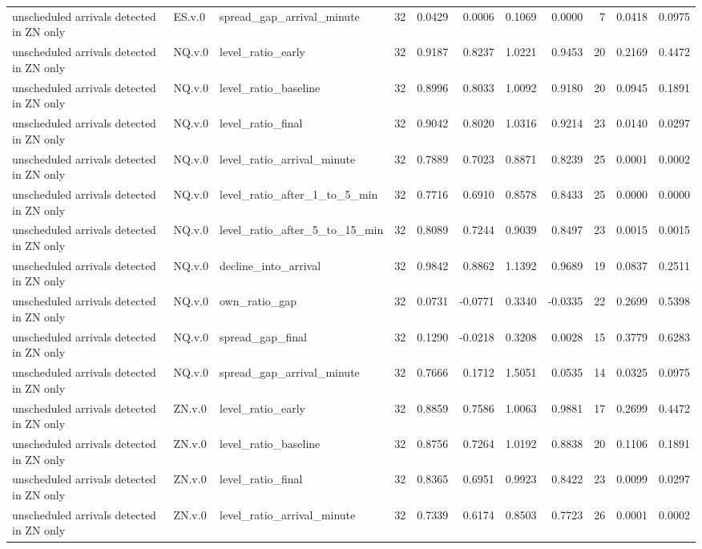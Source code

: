 \begin{tabular}{lllrrrrrrrr}
unscheduled arrivals detected in ZN only & ES.v.0 & spread_gap_arrival_minute & 32 & 0.0429 & 0.0006 & 0.1069 & 0.0000 & 7 & 0.0418 & 0.0975 \\
unscheduled arrivals detected in ZN only & NQ.v.0 & level_ratio_early & 32 & 0.9187 & 0.8237 & 1.0221 & 0.9453 & 20 & 0.2169 & 0.4472 \\
unscheduled arrivals detected in ZN only & NQ.v.0 & level_ratio_baseline & 32 & 0.8996 & 0.8033 & 1.0092 & 0.9180 & 20 & 0.0945 & 0.1891 \\
unscheduled arrivals detected in ZN only & NQ.v.0 & level_ratio_final & 32 & 0.9042 & 0.8020 & 1.0316 & 0.9214 & 23 & 0.0140 & 0.0297 \\
unscheduled arrivals detected in ZN only & NQ.v.0 & level_ratio_arrival_minute & 32 & 0.7889 & 0.7023 & 0.8871 & 0.8239 & 25 & 0.0001 & 0.0002 \\
unscheduled arrivals detected in ZN only & NQ.v.0 & level_ratio_after_1_to_5_min & 32 & 0.7716 & 0.6910 & 0.8578 & 0.8433 & 25 & 0.0000 & 0.0000 \\
unscheduled arrivals detected in ZN only & NQ.v.0 & level_ratio_after_5_to_15_min & 32 & 0.8089 & 0.7244 & 0.9039 & 0.8497 & 23 & 0.0015 & 0.0015 \\
unscheduled arrivals detected in ZN only & NQ.v.0 & decline_into_arrival & 32 & 0.9842 & 0.8862 & 1.1392 & 0.9689 & 19 & 0.0837 & 0.2511 \\
unscheduled arrivals detected in ZN only & NQ.v.0 & own_ratio_gap & 32 & 0.0731 & -0.0771 & 0.3340 & -0.0335 & 22 & 0.2699 & 0.5398 \\
unscheduled arrivals detected in ZN only & NQ.v.0 & spread_gap_final & 32 & 0.1290 & -0.0218 & 0.3208 & 0.0028 & 15 & 0.3779 & 0.6283 \\
unscheduled arrivals detected in ZN only & NQ.v.0 & spread_gap_arrival_minute & 32 & 0.7666 & 0.1712 & 1.5051 & 0.0535 & 14 & 0.0325 & 0.0975 \\
unscheduled arrivals detected in ZN only & ZN.v.0 & level_ratio_early & 32 & 0.8859 & 0.7586 & 1.0063 & 0.9881 & 17 & 0.2699 & 0.4472 \\
unscheduled arrivals detected in ZN only & ZN.v.0 & level_ratio_baseline & 32 & 0.8756 & 0.7264 & 1.0192 & 0.8838 & 20 & 0.1106 & 0.1891 \\
unscheduled arrivals detected in ZN only & ZN.v.0 & level_ratio_final & 32 & 0.8365 & 0.6951 & 0.9923 & 0.8422 & 23 & 0.0099 & 0.0297 \\
unscheduled arrivals detected in ZN only & ZN.v.0 & level_ratio_arrival_minute & 32 & 0.7339 & 0.6174 & 0.8503 & 0.7723 & 26 & 0.0001 & 0.0002 \\

\end{tabular}
